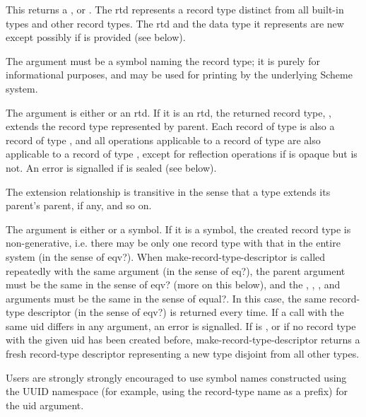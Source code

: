 \begin{entry}{%
}
   
This returns a , or .
The rtd represents a record type distinct from all built-in types and
other record types. The rtd and the data type it represents are new
except possibly if  is provided (see below).

The  argument must be a symbol naming the record type; it is
purely for informational purposes, and may be used for printing by the
underlying Scheme system.

The  argument is either \schfalse{} or an rtd. If it is an
rtd, the returned record type, , extends the record type
 represented by parent. Each record of type  is also a
record of type , and all operations applicable to a record of
type  are also applicable to a record of type , except for
reflection operations if  is opaque but  is not. An error is
signalled if  is sealed (see below).
   
The extension relationship is transitive in the sense that a type extends
its parent's parent, if any, and so on.
   
The  argument is either \schfalse{} or a symbol. If it is a
symbol, the created record type is non-generative, i.e. there may be
only one record type with that  in the entire system (in the
sense of {\cf eqv?}).  When {\cf make-record-type-descriptor} is
called repeatedly with the same  argument (in the sense of
{\cf eq?}), the parent argument must be the same in the sense of {\cf
  eqv?}  (more on this below), and the , ,
, and  arguments must be the same in the
sense of {\cf equal?}.  In this case, the same record-type descriptor
(in the sense of {\cf eqv?})  is returned every time. If a call with
the same uid differs in any argument, an error is signalled. If
 is \schfalse, or if no record type with the given uid has
been created before, {\cf make-record-type-descriptor} returns a fresh
record-type descriptor representing a new type disjoint from all other
types.

\begin{note}   
  Users are strongly strongly encouraged to use symbol names
  constructed using the UUID namespace (for example, using the
  record-type name as a prefix) for the uid argument.
\end{note}


\end{entry}
